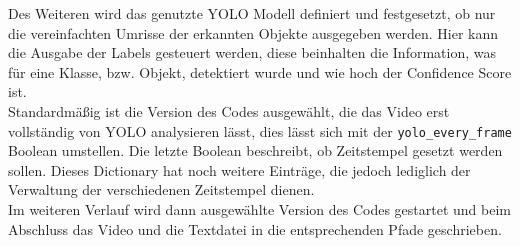 {	Des Weiteren wird das genutzte YOLO Modell definiert und festgesetzt, ob nur die vereinfachten Umrisse der erkannten Objekte ausgegeben werden. Hier kann die Ausgabe der Labels gesteuert werden, diese beinhalten die Information, was für eine Klasse, bzw. Objekt, detektiert wurde und wie hoch der Confidence Score ist. \\
	Standardmäßig ist die Version des Codes ausgewählt, die das Video erst vollständig von YOLO analysieren lässt, dies lässt sich mit der \lstinline|yolo_every_frame| Boolean umstellen. Die letzte Boolean beschreibt, ob Zeitstempel gesetzt werden sollen. Dieses Dictionary hat noch weitere Einträge, die jedoch lediglich der Verwaltung der verschiedenen Zeitstempel dienen. \\
	

	Im weiteren Verlauf wird dann ausgewählte Version des Codes gestartet und beim Abschluss das Video und die Textdatei in die entsprechenden Pfade geschrieben.
}



